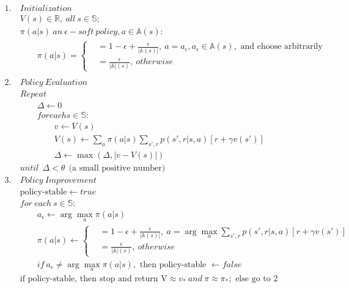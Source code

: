 \documentclass{article}
\begin{document}
\[
  \begin{aligned}
    1. \ & Initialization\\
    & V(s) \in \mathbb{R}, \ all \ s \in \mathbb{S}; \\
    & \pi(a|s) \ an \ \epsilon-soft \ policy, a \in \mathbb{A}(s):\\
    &\qquad \pi(a|s) =\left\{
            \begin{aligned}
               &= 1 - \epsilon + \frac {\epsilon} {|\mathbb{A}(s)|},
                  \ a = a_{\epsilon}, a_{\epsilon} \in \mathbb{A}(s), \text{ and choose arbitrarily } \\
               &= \frac {\epsilon} {|\mathbb{A}|(s)}, \ otherwise
            \end{aligned}
            \right.\\
    \\
    2. \ & Policy \ Evaluation\\
    &Repeat\\
    &\qquad \Delta \leftarrow 0\\
    &\qquad for each s \in \mathbb{S}:\\
    &\qquad \qquad v \leftarrow V(s)\\
    &\qquad \qquad V(s) \leftarrow \sum_a \pi(a|s)\sum_{s', r} p(s',r|s,a)[r + \gamma v(s')] \\
    &\qquad \qquad \Delta \leftarrow \max (\Delta, |v - V(s)|)\\
    &until \ \ \Delta < \theta \ \ \text{(a small positive number)}
    \\
    3. \ & Policy \ Improvement\\
    &\text{policy-stable} \leftarrow true\\
    &for \ each \ s \in \mathbb{S}:\\
    &\qquad a_{\epsilon} \leftarrow \arg\max_a \pi(a|s)\\
    &\qquad \pi(a|s) \leftarrow \left\{
      \begin{aligned}
        &= 1 - \epsilon + \frac {\epsilon} {|\mathbb{A}(s)|},
               \ a = \arg\max_a \sum_{s', r} p(s',r|s,a)[r + \gamma v(s')] \\
        &= \frac {\epsilon} {|\mathbb{A}|(s)}, \ otherwise
      \end{aligned}
    \right.\\
    &\qquad if \ a_{\epsilon} \not= \arg\max_a \pi(a|s), \text { then policy-stable } \leftarrow false \\
    &\text {if policy-stable, then stop and return V}  \approx v_* \ and \ \pi \approx \pi_*; \text { else go to 2}
  \end{aligned}
\]
\end{document}
